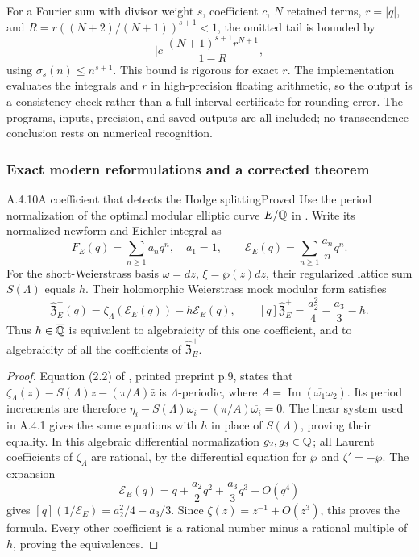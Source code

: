 For a Fourier sum with divisor weight $s$, coefficient $c$, $N$ retained terms, $r=|q|$, and $R=r((N+2)/(N+1))^{s+1}<1$, the omitted tail is bounded by
\[
 |c|\frac{(N+1)^{s+1}r^{N+1}}{1-R},
\]
using $\sigma_s(n)\le n^{s+1}$. This bound is rigorous for exact $r$. The implementation evaluates the integrals and $r$ in high-precision floating arithmetic, so the output is a consistency check rather than a full interval certificate for rounding error. The programs, inputs, precision, and saved outputs are all included; no transcendence conclusion rests on numerical recognition.
\subsubsection{Exact modern reformulations and a corrected theorem}

\begin{result}{A.4.10}{A coefficient that detects the Hodge splitting}{Proved}
Use the period normalization of the optimal modular elliptic curve $E/\mathbb Q$ in \cite{EllAGOR2015}. Write its normalized newform and Eichler integral as
\[
 F_E(q)=\sum_{n\ge1}a_nq^n,\quad a_1=1,
 \qquad \mathcal E_E(q)=\sum_{n\ge1}\frac{a_n}{n}q^n.
\]
For the short-Weierstrass basis $\omega=dz$, $\xi=\wp(z)dz$, their regularized lattice sum $S(\Lambda)$ equals $h$. Their holomorphic Weierstrass mock modular form satisfies
\[
 \widehat{\mathfrak Z}_E^+(q)
 =\zeta_\Lambda(\mathcal E_E(q))-h\mathcal E_E(q),
 \qquad
 [q]\widehat{\mathfrak Z}_E^+
 =\frac{a_2^2}{4}-\frac{a_3}{3}-h.
\]
Thus $h\in\overline{\mathbb Q}$ is equivalent to algebraicity of this one coefficient, and to algebraicity of all the coefficients of $\widehat{\mathfrak Z}_E^+$.
\end{result}
\begin{proof}
Equation (2.2) of \cite{EllAGOR2015}, printed preprint p.9, states that
$\zeta_\Lambda(z)-S(\Lambda)z-(\pi/A)\bar z$ is $\Lambda$-periodic, where $A=\operatorname{Im}(\overline{\omega_1}\omega_2)$. Its period increments are therefore
$\eta_i-S(\Lambda)\omega_i-(\pi/A)\overline{\omega_i}=0$.
The linear system used in A.4.1 gives the same equations with $h$ in place of $S(\Lambda)$, proving their equality. In this algebraic differential normalization $g_2,g_3\in\mathbb Q$; all Laurent coefficients of $\zeta_\Lambda$ are rational, by the differential equation for $\wp$ and $\zeta'=-\wp$. The expansion
\[
 \mathcal E_E(q)=q+\frac{a_2}{2}q^2+\frac{a_3}{3}q^3+O(q^4)
\]
gives $[q](1/\mathcal E_E)=a_2^2/4-a_3/3$. Since $\zeta(z)=z^{-1}+O(z^3)$, this proves the formula. Every other coefficient is a rational number minus a rational multiple of $h$, proving the equivalences.
\end{proof}

